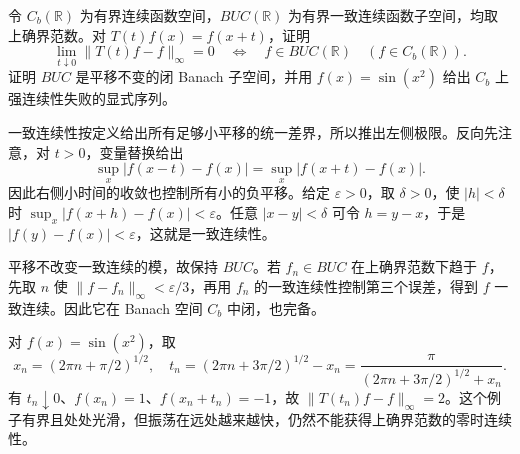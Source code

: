 \begin{exercise}\label{b2:ex:app-D-6}
令 \(C_b(\mathbb R)\) 为有界连续函数空间，\(BUC(\mathbb R)\) 为有界一致连续函数子空间，均取上确界范数。对 \(T(t)f(x)=f(x+t)\)，证明
\[
 \lim_{t\downarrow0}\|T(t)f-f\|_\infty=0
 \quad\Longleftrightarrow\quad f\in BUC(\mathbb R)
 \quad(f\in C_b(\mathbb R)).
\]
证明 \(BUC\) 是平移不变的闭 Banach 子空间，并用 \(f(x)=\sin(x^2)\) 给出 \(C_b\) 上强连续性失败的显式序列。
\end{exercise}
\begin{solution}
一致连续性按定义给出所有足够小平移的统一差界，所以推出左侧极限。反向先注意，对 \(t>0\)，变量替换给出
\[
 \sup_x|f(x-t)-f(x)|=\sup_x|f(x+t)-f(x)|.
\]
因此右侧小时间的收敛也控制所有小的负平移。给定 \(\varepsilon>0\)，取 \(\delta>0\)，使 \(|h|<\delta\) 时 \(\sup_x|f(x+h)-f(x)|<\varepsilon\)。任意 \(|x-y|<\delta\) 可令 \(h=y-x\)，于是 \(|f(y)-f(x)|<\varepsilon\)，这就是一致连续性。

平移不改变一致连续的模，故保持 \(BUC\)。若 \(f_n\in BUC\) 在上确界范数下趋于 \(f\)，先取 \(n\) 使 \(\|f-f_n\|_\infty<\varepsilon/3\)，再用 \(f_n\) 的一致连续性控制第三个误差，得到 \(f\) 一致连续。因此它在 Banach 空间 \(C_b\) 中闭，也完备。

对 \(f(x)=\sin(x^2)\)，取
\[
 x_n=(2\pi n+\pi/2)^{1/2},\quad
 t_n=(2\pi n+3\pi/2)^{1/2}-x_n
     =\frac\pi{(2\pi n+3\pi/2)^{1/2}+x_n}.
\]
有 \(t_n\downarrow0\)、\(f(x_n)=1\)、\(f(x_n+t_n)=-1\)，故
\(\|T(t_n)f-f\|_\infty=2\)。这个例子有界且处处光滑，但振荡在远处越来越快，仍然不能获得上确界范数的零时连续性。
\end{solution}

